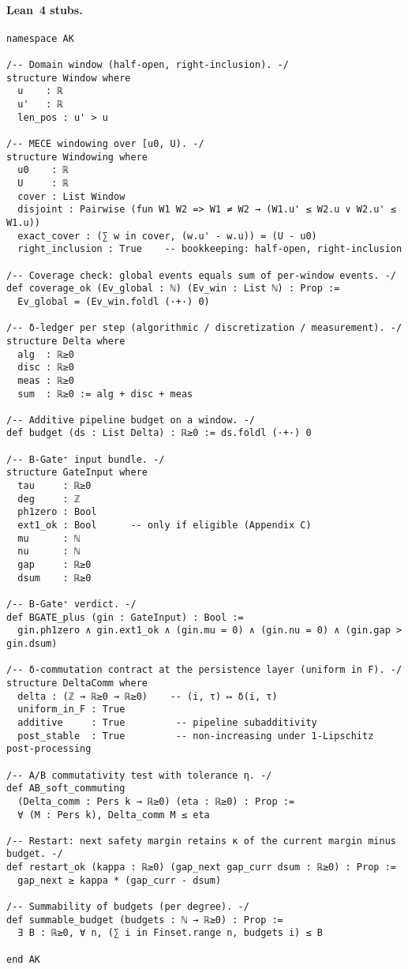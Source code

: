\documentclass[11pt]{article}
\numberwithin{equation}{section}
\theoremstyle{definition}
\begin{document}
\paragraph{Lean~4 stubs.}
\begin{verbatim}
namespace AK

/-- Domain window (half-open, right-inclusion). -/
structure Window where
  u    : ℝ
  u'   : ℝ
  len_pos : u' > u

/-- MECE windowing over [u0, U). -/
structure Windowing where
  u0    : ℝ
  U     : ℝ
  cover : List Window
  disjoint : Pairwise (fun W1 W2 => W1 ≠ W2 → (W1.u' ≤ W2.u ∨ W2.u' ≤ W1.u))
  exact_cover : (∑ w in cover, (w.u' - w.u)) = (U - u0)
  right_inclusion : True    -- bookkeeping: half-open, right-inclusion

/-- Coverage check: global events equals sum of per-window events. -/
def coverage_ok (Ev_global : ℕ) (Ev_win : List ℕ) : Prop :=
  Ev_global = (Ev_win.foldl (·+·) 0)

/-- δ-ledger per step (algorithmic / discretization / measurement). -/
structure Delta where
  alg  : ℝ≥0
  disc : ℝ≥0
  meas : ℝ≥0
  sum  : ℝ≥0 := alg + disc + meas

/-- Additive pipeline budget on a window. -/
def budget (ds : List Delta) : ℝ≥0 := ds.foldl (·+·) 0

/-- B-Gate⁺ input bundle. -/
structure GateInput where
  tau     : ℝ≥0
  deg     : ℤ
  ph1zero : Bool
  ext1_ok : Bool      -- only if eligible (Appendix C)
  mu      : ℕ
  nu      : ℕ
  gap     : ℝ≥0
  dsum    : ℝ≥0

/-- B-Gate⁺ verdict. -/
def BGATE_plus (gin : GateInput) : Bool :=
  gin.ph1zero ∧ gin.ext1_ok ∧ (gin.mu = 0) ∧ (gin.nu = 0) ∧ (gin.gap > gin.dsum)

/-- δ-commutation contract at the persistence layer (uniform in F). -/
structure DeltaComm where
  delta : (ℤ → ℝ≥0 → ℝ≥0)    -- (i, τ) ↦ δ(i, τ)
  uniform_in_F : True
  additive     : True         -- pipeline subadditivity
  post_stable  : True         -- non-increasing under 1-Lipschitz post-processing

/-- A/B commutativity test with tolerance η. -/
def AB_soft_commuting
  (Delta_comm : Pers k → ℝ≥0) (eta : ℝ≥0) : Prop :=
  ∀ (M : Pers k), Delta_comm M ≤ eta

/-- Restart: next safety margin retains κ of the current margin minus budget. -/
def restart_ok (kappa : ℝ≥0) (gap_next gap_curr dsum : ℝ≥0) : Prop :=
  gap_next ≥ kappa * (gap_curr - dsum)

/-- Summability of budgets (per degree). -/
def summable_budget (budgets : ℕ → ℝ≥0) : Prop :=
  ∃ B : ℝ≥0, ∀ n, (∑ i in Finset.range n, budgets i) ≤ B

end AK
\end{verbatim}
\end{document}
